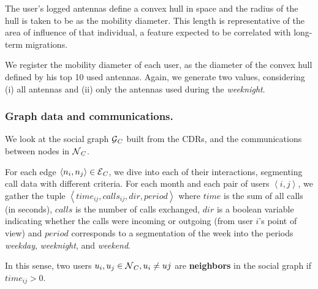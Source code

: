The user's logged antennas define a convex hull in space and the radius of the hull is taken to be as the mobility diameter. This length is representative of the area of influence of that individual, a feature expected to be correlated with long-term migrations.

We register the mobility diameter of each user, as the diameter of the convex hull defined by his top 10 used antennas. Again, we generate two values, considering (i) all antennas and (ii) only the antennas used during the \textit{weeknight}.



\subsubsection{Graph data and communications.}




We look at the social graph $\operatorname{\mathcal{G}}_C$ built from the CDRs, and the communications between nodes in $\operatorname{\mathcal{N}}_C$.

For each edge $\left< n_i, n_j \right> \in \operatorname{\mathcal{E}}_C$, we dive into each of their interactions, segmenting call data with different criteria. For %
each month and each pair of users $\left< i,j \right>$, we gather the tuple $\left< time_{ij}, calls_{ij}, dir, period \right>$ where $time$ is the sum of all calls (in seconds), $calls$ is the number of calls exchanged, $dir$ is a boolean variable indicating whether the calls were incoming or outgoing (from user $i$'s point of view) and $period$ corresponds to a segmentation of the week into the periods \textit{weekday}, \textit{weeknight}, and \textit{weekend}.


In this sense, two users $u_i, u_j \in \operatorname{\mathcal{N}}_C, u_i \neq uj$ are \textbf{neighbors} in the social graph if $time_{ij} > 0$.



